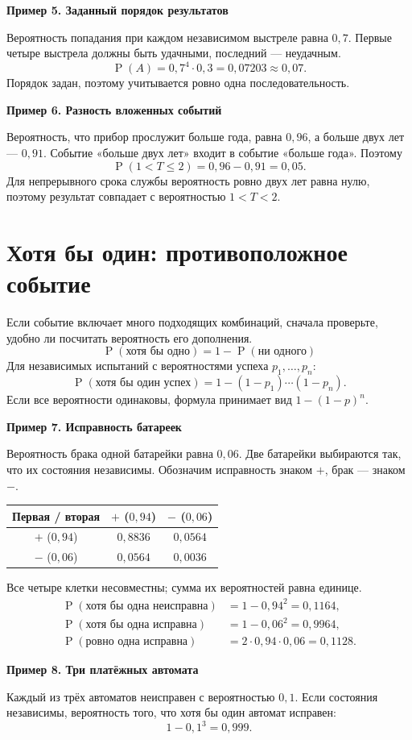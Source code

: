 \documentclass[a4paper,12pt]{article}
\newcommand{\example}[1]{\par\medskip\textcolor{darkaccent}{\textbf{#1}}\par}
\newcommand{\prob}{\mathop{\mathrm{P}}}
\begin{document}
\example{Пример 5. Заданный порядок результатов}
Вероятность попадания при каждом независимом выстреле равна $0,7$. Первые четыре выстрела должны быть удачными, последний — неудачным.
\[ \prob(A)=0,7^4\cdot0,3=0,07203\approx0,07. \]
Порядок задан, поэтому учитывается ровно одна последовательность.

\example{Пример 6. Разность вложенных событий}
Вероятность, что прибор прослужит больше года, равна $0,96$, а больше двух лет — $0,91$. Событие «больше двух лет» входит в событие «больше года». Поэтому
\[ \prob(1<T\leq 2)=0,96-0,91=0,05. \]
Для непрерывного срока службы вероятность ровно двух лет равна нулю, поэтому результат совпадает с вероятностью $1<T<2$.

\clearpage
\section{Хотя бы один: противоположное событие}
Если событие включает много подходящих комбинаций, сначала проверьте, удобно ли посчитать вероятность его дополнения.
\[ \boxed{\prob(\text{хотя бы одно})=1-\prob(\text{ни одного})} \]
Для независимых испытаний с вероятностями успеха $p_1,\ldots,p_n$:
\[ \prob(\text{хотя бы один успех})=1-(1-p_1)\cdots(1-p_n). \]
Если все вероятности одинаковы, формула принимает вид $1-(1-p)^n$.

\example{Пример 7. Исправность батареек}
Вероятность брака одной батарейки равна $0,06$. Две батарейки выбираются так, что их состояния независимы. Обозначим исправность знаком $+$, брак — знаком $-$.
\begin{center}
\renewcommand{\arraystretch}{1.4}
\begin{tabular}{@{}c c c@{}}
\toprule
Первая / вторая & $+$ ($0,94$) & $-$ ($0,06$) \\\midrule
$+$ ($0,94$) & $0,8836$ & $0,0564$ \\
$-$ ($0,06$) & $0,0564$ & $0,0036$ \\
\bottomrule
\end{tabular}
\end{center}
Все четыре клетки несовместны; сумма их вероятностей равна единице.
\begin{align*}
\prob(\text{хотя бы одна неисправна})&=1-0,94^2=0,1164,\\
\prob(\text{хотя бы одна исправна})&=1-0,06^2=0,9964,\\
\prob(\text{ровно одна исправна})&=2\cdot0,94\cdot0,06=0,1128.
\end{align*}

\example{Пример 8. Три платёжных автомата}
Каждый из трёх автоматов неисправен с вероятностью $0,1$. Если состояния независимы, вероятность того, что хотя бы один автомат исправен:
\[ 1-0,1^3=0,999. \]
\end{document}
